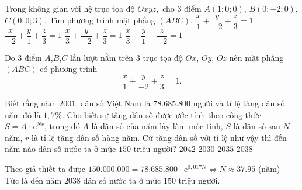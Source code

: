 \begin{ex}%
	Trong không gian với hệ trục tọa độ $ Oxyz, $	cho $ 3 $ điểm $ A(1;0;0) $, $ B(0;-2;0) $, $ C(0;0;3) $. Tìm phương trình mặt phẳng $ (ABC). $
	\choice
	{\True $ \dfrac{x}{1}+\dfrac{y}{-2}+\dfrac{z}{3} = 1 $}
	{$ \dfrac{x}{-2}+\dfrac{y}{1}+\dfrac{z}{3} = 1 $}
	{$ \dfrac{x}{3}+\dfrac{y}{-2}+\dfrac{z}{3} = 1 $}
	{$ \dfrac{x}{3}+\dfrac{y}{1}+\dfrac{z}{-2} = 1 $}
	\loigiai
	{Do $ 3 $ điểm $ A$,$ B $,$C $ lần lượt nằm trên $ 3 $ trục tọa độ $ Ox $, $ Oy $, $ Oz $ nên mặt phẳng $ (ABC) $ có phương trình $$ \dfrac{x}{1}+\dfrac{y}{-2}+\dfrac{z}{3} = 1. $$
		
	}
\end{ex}
\begin{ex}%
	Biết rằng năm $ 2001 $, dân số Việt Nam là $ 78{.}685{.}800 $ người và tỉ lệ tăng dân số năm đó là $ 1{,}7 \% $. Cho biết sự tăng dân số được ước tính theo công thức $ S = A \cdot \mathrm{\,e}^{Nr} $, trong đó $ A $ là dân số của năm lấy làm mốc tính, $ S $ là dân số sau $ N $ năm, $ r $ là tỉ lệ tăng dân số hàng năm. Cứ tăng dân số với tỉ lệ như vậy thì đến năm nào dân số nước ta ở mức $ 150 $ triệu người?
	\choice
	{$ 2042 $}
	{$ 2030 $}
	{$ 2035 $}
	{\True $ 2038 $}
	\loigiai
	{Theo giả thiết ta được $ 150{.}000{.}000 = 78{.}685{.}800 \cdot \mathrm{\,e}^{0,017N} \Leftrightarrow N \approx 37.95$ (năm)\\
		Tức là đến năm $ 2038 $ dân số nước ta ở mức $ 150 $ triệu người.
		
	}
\end{ex}
